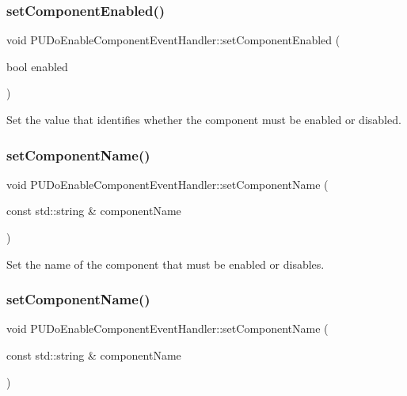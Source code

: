 \subsubsection{\texorpdfstring{set\+Component\+Enabled()}{setComponentEnabled()}\hspace{0.1cm}{\footnotesize\ttfamily [2/2]}}
{\footnotesize\ttfamily void P\+U\+Do\+Enable\+Component\+Event\+Handler\+::set\+Component\+Enabled (\begin{DoxyParamCaption}\item[{bool}]{enabled }\end{DoxyParamCaption})\hspace{0.3cm}{\ttfamily [inline]}}

Set the value that identifies whether the component must be enabled or disabled. \mbox{\label{classPUDoEnableComponentEventHandler_ae109d2c4b1356e30183884ed85fd2400}} 
\subsubsection{\texorpdfstring{set\+Component\+Name()}{setComponentName()}\hspace{0.1cm}{\footnotesize\ttfamily [1/2]}}
{\footnotesize\ttfamily void P\+U\+Do\+Enable\+Component\+Event\+Handler\+::set\+Component\+Name (\begin{DoxyParamCaption}\item[{const std\+::string \&}]{component\+Name }\end{DoxyParamCaption})\hspace{0.3cm}{\ttfamily [inline]}}

Set the name of the component that must be enabled or disables. \mbox{\label{classPUDoEnableComponentEventHandler_ae109d2c4b1356e30183884ed85fd2400}} 
\subsubsection{\texorpdfstring{set\+Component\+Name()}{setComponentName()}\hspace{0.1cm}{\footnotesize\ttfamily [2/2]}}
{\footnotesize\ttfamily void P\+U\+Do\+Enable\+Component\+Event\+Handler\+::set\+Component\+Name (\begin{DoxyParamCaption}\item[{const std\+::string \&}]{component\+Name }\end{DoxyParamCaption})\hspace{0.3cm}{\ttfamily [inline]}}

